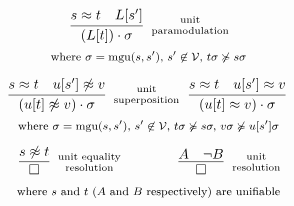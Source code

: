 \begin{gather*}
	\infer
	[\TOPTEXT{unit}{paramodulation}]
	{(L[t])\cdot\sigma}
	{s\foEQ t&L[s']}
\\\text{\footnotesize 
where $\sigma=\mgu(s,s')$,
$s'\not\in\mcV$,
$t\sigma\not\succcurlyeq s\sigma$
}\\[0.5em]
%
	\infer
	[\TOPTEXT{unit}{superposition}]
	{(u[t]\foNEQ v)\cdot\sigma}
	{s\foEQ t&u[s']\foNEQ v}
	\hspace{2mm}
	\infer
	[]
	{(u[t]\foEQ v)\cdot\sigma}
	{s\foEQ t&u[s']\foEQ v}
\\\text{\footnotesize 
where $\sigma=\mgu(s,s')$,
$s'\not\in\mathcal{V},$
$t\sigma\not\succcurlyeq s\sigma,$
$v\sigma\not\succcurlyeq u[s']\sigma$
}\\[0.5em]
%
	\infer
	[\TOPTEXT{unit equality}{resolution}]
	{\emptyclause}
	{s\foNEQ t}
	\hspace{4em}
	\infer
	[\TOPTEXT{unit}{resolution}]
	{\emptyclause}
	{A&\lnot B}\\
\text{\footnotesize 
where $s$ and $t$ ($A$ and $B$ respectively) are unifiable
}
\end{gather*}